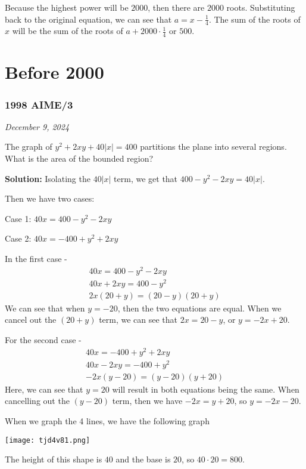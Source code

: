 \documentclass[../mathproblems.tex]{subfiles}
\begin{document}
Because the highest power will be $2000$, then there are $2000$ roots. Substituting back to the original equation, we can see that $a = x-\frac{1}{4}$. The sum of the roots of $x$ will be the sum of the roots of $a+2000\cdot\frac{1}{4}$ or $\boxed{500}$.

\noindent\hrulefill
\section{Before 2000}
\subsubsection*{1998 AIME/3}
\textit{December 9, 2024}

The graph of $y^2 + 2xy + 40|x|= 400$ partitions the plane into several regions. What is the area of the bounded region? 

\textbf{Solution:}
Isolating the $40|x|$ term, we get that $400-y^2-2xy = 40|x|$.

Then we have two cases:

Case 1:
$40x = 400-y^2-2xy$

Case 2:
$40x = -400+y^2+2xy$

In the first case - 
\begin{align*}
40x = 400-y^2-2xy\\
40x+2xy = 400-y^2\\
2x(20+y) = (20-y)(20+y)
\end{align*}
We can see that when $y=-20$, then the two equations are equal. When we cancel out the $(20+y)$ term, we can see that $2x=20-y$, or $y=-2x+20$.

For the second case - 
\begin{align*}
40x = -400+y^2+2xy\\
40x-2xy = -400+y^2\\
-2x(y-20) = (y-20)(y+20)
\end{align*}
Here, we can see that $y=20$ will result in both equations being the same. When cancelling out the $(y-20)$ term, then we have $-2x=y+20$, so $y=-2x-20$.

When we graph the 4 lines, we have the following graph
\begin{center}
    \texttt{[image: tjd4v81.png]}
\end{center}

The height of this shape is $40$ and the base is $20$, so $40\cdot 20 = \boxed{800}$.

\noindent\hrulefill
\end{document}
